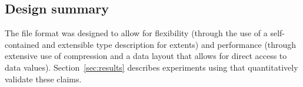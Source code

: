 \subsection{Design summary}

The \DataSeries{} file format was designed to allow for flexibility
(through the use of a self-contained and extensible type description
for extents) and performance (through extensive use of compression and
a data layout that allows for direct access to data values). 
Section~\ref{sec:results} describes experiments using
\DataSeries{} that quantitatively validate these claims.
